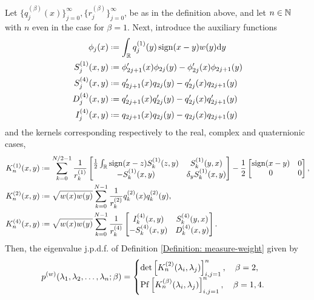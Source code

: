 \begin{thm}
	Let $\{q_j^{(\beta)}(x)\}_{j=0}^{\infty}, \{r_j^{(\beta)}\}_{j=0}^{\infty}$, be as in the definition above, and let $n \in \mathbb{N}$ with $n$ even in the case for $\beta = 1$. Next, introduce the auxiliary functions
	\begin{align}
		\phi_j(x) & \deff \int_{\R} q_j^{(1)}(y) \sign(x-y) \wf(y) \dd y \\
		S_j^{(1)}(x,y) & \deff \phi'_{2j+1}(x)\phi_{2j}(y) - \phi'_{2j}(x)\phi_{2j+1}(y) \\
		S_j^{(4)}(x,y) & \deff q'_{2j+1}(x)q_{2j}(y) - q'_{2j}(x)q_{2j+1}(y) \\
		D_j^{(4)}(x,y) & \deff q'_{2j+1}(x)q'_{2j}(y) - q'_{2j}(x)q'_{2j+1}(y) \\
		I_j^{(4)}(x,y) & \deff q_{2j+1}(x)q_{2j}(y) - q_{2j}(x)q_{2j+1}(y)
	\end{align}
	and the kernels corresponding respectively to the real, complex and quaternionic cases,
	\begin{align}
		K_n^{(1)}(x,y) & \deff \sum_{k=0}^{N/2-1} \frac{1}{r_k^{(1)}} \begin{bmatrix}
			\frac{1}{2} \int_{\R} \sign(x-z) S_k^{(1)}(z,y) & S_k^{(1)}(y,x) \\
			-S_k^{(1)}(x,y) & \delta_y S_k^{(1)}(x,y)
		\end{bmatrix} 
		- \frac{1}{2} 
		\begin{bmatrix}
			\sign(x-y) & 0 \\
			0 & 0
		\end{bmatrix},   \\
		K_n^{(2)}(x,y) & \deff \sqrt{\wf(x) \wf(y)} \sum_{k=0}^{N-1} \frac{1}{r_k^{(2)}} q_k^{(2)}(x) q_k^{(2)}(y), \\
		K_n^{(4)}(x,y) & \deff \sqrt{\wf(x) \wf(y)} \sum_{k=0}^{N-1} \frac{1}{r_k^{(4)}}
		\begin{bmatrix}
			I_k^{(4)}(x,y) & S_k^{(4)}(y,x) \\
			-S_k^{(4)}(x,y) & D_k^{(4)}(x,y)
		\end{bmatrix}.
	\end{align}
	Then, the eigenvalue j.p.d.f. of Definition \ref{Definition: measure-weight} given by
	\begin{equation}
	p^{(w)}(\lambda_1, \lambda_2, \dots, \lambda_n;\beta) = 
	\begin{cases}
		\det\left[ K_n^{(2)}(\lambda_i, \lambda_j) \right]_{i,j=1}^{n}, \quad \beta = 2, \\
		\operatorname{Pf}\left[ K_n^{(\beta)}(\lambda_i, \lambda_j) \right]_{i,j=1}^{n}, \quad \beta = 1,4.
	\end{cases}
	\end{equation}
	\label{Theorem: Kernel}
\end{thm}



